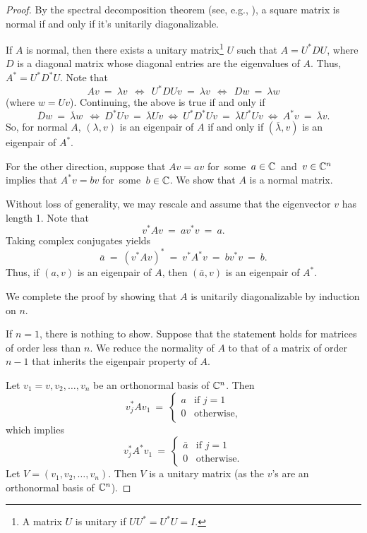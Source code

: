 \documentclass{article}
\newcommand{\twocase}[5]{#1 \begin{cases} #2 & \text{#3}\\ #4
&\text{#5} \end{cases}   }
\begin{document}
\begin{proof}  By the spectral decomposition theorem (see,   e.g., \cite[Theorem\,3.2.2, p.\,121]{Zh}), a square matrix is normal if and only if it's unitarily diagonalizable.
\medskip

If $A$ is normal, then there exists a unitary matrix\footnote{A matrix $U$ is unitary if $UU^* = U^*U = I$.} $U$ such that
$A=U^*DU$, where $D$ is a diagonal matrix whose diagonal entries are the eigenvalues of $A$.
Thus,  $A^*=U^*D^*U$. Note that  %
 $$Av \ = \ \lambda v \  \ \Leftrightarrow \  \ U^*DU v\ = \ \lambda v  \ \  \Leftrightarrow \  \  Dw \ =\ \lambda w$$
 (where $w=Uv$). Continuing, the above is true if and only if $$\overline{D}w \ = \
 \overline{\lambda} w \
 \   \Leftrightarrow  \ D^*Uv \ = \
 \overline{\lambda} Uv    \ \Leftrightarrow
 \   U^*D^*Uv \ = \
 \overline{\lambda} U^*Uv    \ \Leftrightarrow  \
  A^*v\ =\
 \overline{\lambda} v.$$  %
 So, for normal $A$,   $(\lambda, v)$ is an eigenpair of $A$ if and only if  $(\overline{\lambda}, v)$ is an eigenpair of $A^*$.
 \medskip

For the other direction, suppose that
$Av = av$ \mbox{for some $a\in \Bbb C$  and $v\in \Bbb C^n$}
  implies  that $A^*v = bv $ \mbox{for some $b\in \Bbb C$}.
We show that $A$ is a  normal matrix.
\medskip

Without loss of generality,  we may rescale and assume that the eigenvector $v$ has length 1. Note that
$$v^*Av \ = \  a v^*v \ = \ a.$$ Taking complex conjugates yields $$\bar{a} \ = \ (v^*Av)^* \ = \  v^*A^*v \ = \ bv^*v\ = \ b.$$
Thus,  if $(a, v)$ is an eigenpair of $A$, then $(\bar{a}, v)$ is an eigenpair of $A^*$.
\medskip

We complete the proof by showing that $A$ is unitarily diagonalizable by induction on $n$.
\medskip

If $n=1$, there is nothing to show. Suppose that the statement holds for matrices of order less than $n$. We reduce the normality of $A$ to that of a matrix of order $n-1$ that inherits the eigenpair property of $A$.
\medskip

Let $v_1=v, v_2, \dots, v_n$ be an orthonormal basis of $\Bbb C^n$. Then \begin{equation} \twocase{v_j^*Av_1 \ = \ }{a}{if $j=1$}{0}{otherwise,} \end{equation} which implies \begin{equation} \twocase{v_j^*A^*v_1 \ = \ }{\bar{a}}{if $j=1$}{0}{otherwise.} \end{equation} Let $V=(v_1, v_2, \dots, v_n)$. Then $V$ is a unitary matrix (as the $v$'s are an orthonormal basis of $\Bbb C^n$).
\medskip


\end{proof}
\end{document}
